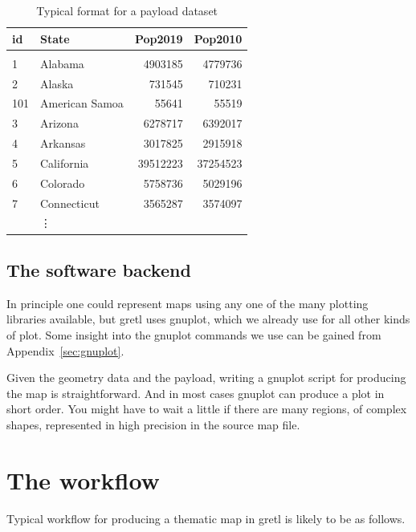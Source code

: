 \documentclass{article}
\begin{document}
\begin{table}[htbp]
\begin{center}
\begin{tabular}{llrr}
  id	& State & Pop2019 & Pop2010 \\
  \hline \\ [-1.75ex]
  1	& Alabama	& 4903185	& 4779736  \\
  2     & Alaska	& 731545	& 710231   \\
  101   & American Samoa	& 55641	& 55519	  \\
  3	& Arizona	& 6278717	& 6392017  \\
  4	& Arkansas	& 3017825	& 2915918  \\
  5	& California	& 39512223	& 37254523 \\
  6	& Colorado	& 5758736	& 5029196  \\
  7	& Connecticut	& 3565287	& 3574097  \\
                & \vdots & \\
\end{tabular}
\end{center}
\caption{Typical format for a payload dataset}
\label{tab:payload}
\end{table}

\subsection{The software backend}
\label{sec:software}

In principle one could represent maps using any one of the many
plotting libraries available, but gretl uses \textsf{gnuplot}, which
we already use for all other kinds of plot. Some insight into the
\textsf{gnuplot} commands we use can be gained from
Appendix~\ref{sec:gnuplot}.

Given the geometry data and the payload, writing a \textsf{gnuplot}
script for producing the map is straightforward. And in most cases
\textsf{gnuplot} can produce a plot in short order. You might have to
wait a little if there are many regions, of complex shapes,
represented in high precision in the source map file.

\section{The workflow}
\label{sec:workflow}

Typical workflow for producing a thematic map in gretl is likely to be
as follows.
\end{document}
